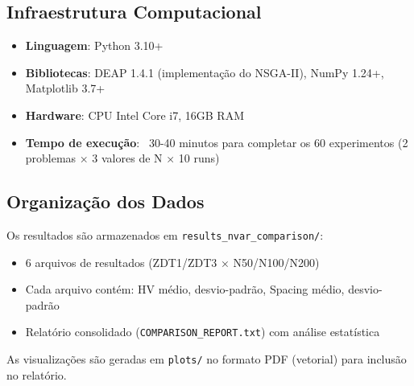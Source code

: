 \subsection{Infraestrutura Computacional}
\begin{itemize}
  \item \textbf{Linguagem}: Python 3.10+
  \item \textbf{Bibliotecas}: DEAP 1.4.1 (implementação do NSGA-II), NumPy 1.24+, Matplotlib 3.7+
  \item \textbf{Hardware}: CPU Intel Core i7, 16GB RAM
  \item \textbf{Tempo de execução}: ~30-40 minutos para completar os 60 experimentos (2 problemas × 3 valores de N × 10 runs)
\end{itemize}

\subsection{Organização dos Dados}
Os resultados são armazenados em \texttt{results\_nvar\_comparison/}:
\begin{itemize}
  \item 6 arquivos de resultados (ZDT1/ZDT3 × N50/N100/N200)
  \item Cada arquivo contém: HV médio, desvio-padrão, Spacing médio, desvio-padrão
  \item Relatório consolidado (\texttt{COMPARISON\_REPORT.txt}) com análise estatística
\end{itemize}

As visualizações são geradas em \texttt{plots/} no formato PDF (vetorial) para inclusão no relatório.